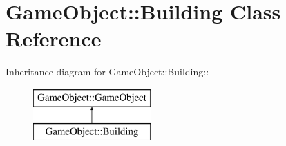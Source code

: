 \hypertarget{classGameObject_1_1Building}{
\section{GameObject::Building Class Reference}
\label{classGameObject_1_1Building}
}
Inheritance diagram for GameObject::Building::\begin{figure}[H]
\begin{center}
\leavevmode
\includegraphics[height=2cm]{classGameObject_1_1Building}
\end{center}
\end{figure}
